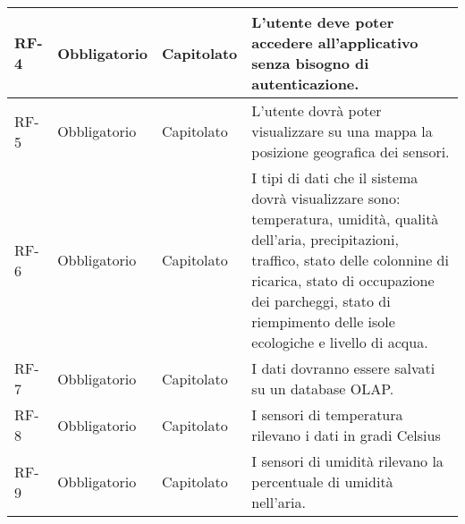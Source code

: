\begin{longtable}{|>{\centering\arraybackslash}m{}|>{\centering\arraybackslash}m{}|>{\centering\arraybackslash}m{}|>{\centering\arraybackslash}m{}|}
	RF-4            & Obbligatorio        & Capitolato     & L'utente deve poter accedere all'applicativo senza bisogno di autenticazione.                                                                                                                                                                                                                                                                                                    \\\hline
	RF-5            & Obbligatorio        & Capitolato     & L'utente dovrà poter visualizzare su una mappa la posizione geografica dei sensori.                                                                                                                                                                                                                                                                                              \\\hline
	RF-6            & Obbligatorio        & Capitolato     & I tipi di dati che il sistema dovrà visualizzare sono: temperatura, umidità, qualità dell'aria, precipitazioni, traffico, stato delle colonnine di ricarica, stato di occupazione dei parcheggi, stato di riempimento delle isole ecologiche e livello di acqua.                                                                                                                 \\\hline
	RF-7            & Obbligatorio        & Capitolato     & I dati dovranno essere salvati su un database OLAP.                                                                                                                                                                                                                                                                                                                              \\\hline
	RF-8            & Obbligatorio        & Capitolato     & I sensori di temperatura rilevano i dati in gradi Celsius                                                                                                                                                                                                                                                                                                                        \\\hline
	RF-9            & Obbligatorio        & Capitolato     & I sensori di umidità rilevano la percentuale di umidità nell’aria.                                                                                                                                                                                                                                                                                                               \\\hline

\end{longtable}
